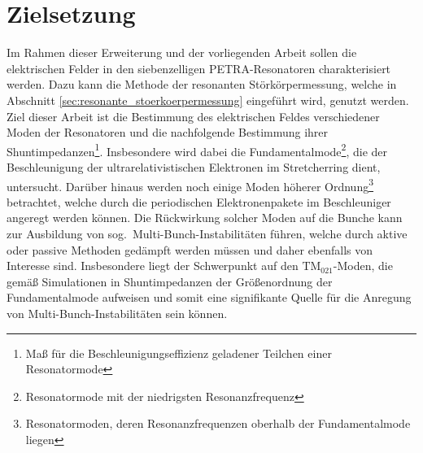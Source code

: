 \section{Zielsetzung}
Im Rahmen dieser Erweiterung und der vorliegenden Arbeit sollen die elektrischen Felder in den siebenzelligen PETRA-Resonatoren charakterisiert werden.
Dazu kann die Methode der resonanten Störkörpermessung, welche in Abschnitt \ref{sec:resonante_stoerkoerpermessung} eingeführt wird, genutzt werden.
Ziel dieser Arbeit ist die Bestimmung des elektrischen Feldes verschiedener Moden der Resonatoren und die nachfolgende Bestimmung ihrer Shuntimpedanzen\footnote{Maß für die Beschleunigungseffizienz geladener Teilchen einer Resonatormode}.
Insbesondere wird dabei die Fundamentalmode\footnote{Resonatormode mit der niedrigsten Resonanzfrequenz}, die der Beschleunigung der ultrarelativistischen Elektronen im Stretcherring dient, untersucht.
Darüber hinaus werden noch einige Moden höherer Ordnung\footnote{Resonatormoden, deren Resonanzfrequenzen oberhalb der Fun\-da\-men\-tal\-mode liegen} betrachtet, welche durch die periodischen Elektronenpakete im Beschleuniger angeregt werden können.
Die Rückwirkung solcher Moden auf die Bunche kann zur Ausbildung von sog.\ Multi-Bunch-Instabilitäten führen, welche durch aktive oder passive Methoden gedämpft werden müssen und daher ebenfalls von Interesse sind.
Insbesondere liegt der Schwerpunkt auf den $\mathrm{TM}_{021}$-Moden, die gemäß Simulationen in \cite{schedler} Shuntimpedanzen der Größenordnung der Fundamentalmode aufweisen und somit eine signifikante Quelle für die Anregung von Multi-Bunch-Instabilitäten sein können.
